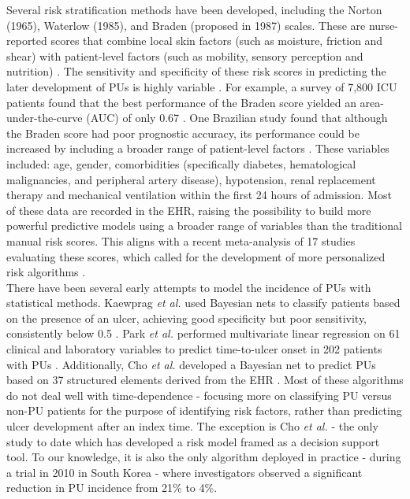 \documentclass{ws-procs11x85}
\begin{document}
\noindent
Several risk stratification methods have been developed, including the Norton (1965), Waterlow (1985), and Braden (proposed in 1987) scales. These are nurse-reported scores that combine local skin factors (such as moisture, friction and shear) with patient-level factors (such as mobility, sensory perception and nutrition) \cite{pancorbo}. The sensitivity and specificity of these risk scores in predicting the later development of PUs is highly variable \cite{cho3}. For example, a survey of 7,800 ICU patients found that the best performance of the Braden score yielded an area-under-the-curve (AUC) of only 0.67 \cite{hyun}. One Brazilian study found that although the Braden score had poor prognostic accuracy, its performance could be increased by including a broader range of patient-level factors \cite{ranza}. These variables included: age, gender, comorbidities (specifically diabetes, hematological malignancies, and peripheral artery disease), hypotension, renal replacement therapy and mechanical ventilation within the first 24 hours of admission. Most of these data are recorded in the EHR, raising the possibility to build more powerful predictive models using a broader range of variables than the traditional manual risk scores. This aligns with a recent meta-analysis of 17 studies evaluating these scores, which called for the development of more personalized risk algorithms \cite{riskscores}.\\

\noindent
There have been several early attempts to model the incidence of PUs with statistical methods. Kaewprag \emph{et al.} used Bayesian nets to classify patients based on the presence of an ulcer, achieving good specificity but poor sensitivity, consistently below 0.5 \cite{ohio}. Park \emph{et al.} performed multivariate linear regression on 61 clinical and laboratory variables to predict time-to-ulcer onset in 202 patients with PUs \cite{ehr2}. Additionally, Cho \emph{et al.} developed a Bayesian net to predict PUs based on 37 structured elements derived from the EHR \cite{cho}. Most of these algorithms do not deal well with time-dependence - focusing more on classifying PU versus non-PU patients for the purpose of identifying risk factors, rather than predicting ulcer development after an index time. The exception is Cho \emph{et al.} - the only study to date which has developed a risk model framed as a decision support tool. To our knowledge, it is also the only algorithm deployed in practice - during a trial in 2010 in South Korea - where investigators observed a significant reduction in PU incidence from 21\% to 4\%. \\
\end{document}
